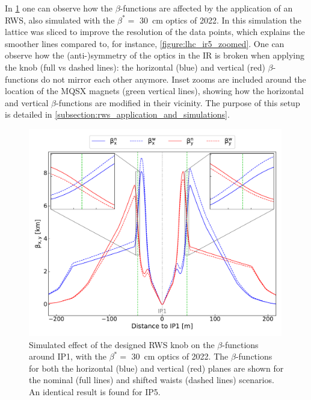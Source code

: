 In \cref{figure:rigid_waist_shift_knob_effect_on_betas} one can observe how the \(\beta\)-functions are affected by the application of an RWS, also simulated with the \(\beta^{\ast} =\) \qty{30}{\centi\metre} optics of \num{2022}.
In this simulation the lattice was sliced to improve the resolution of the data points, which explains the smoother lines compared to, for instance, \cref{figure:lhc_ir5_zoomed}.
One can observe how the (anti-)symmetry of the optics in the IR is broken when applying the knob (full vs dashed lines): the horizontal (\textcolor{mplb}{blue}) and vertical (\textcolor{mplr}{red}) \(\beta\)-functions do not mirror each other anymore.
Inset zooms are included around the location of the MQSX magnets (\textcolor{mqsx_green}{green} vertical lines), showing how the horizontal and vertical \(\beta\)-functions are modified in their vicinity.
The purpose of this setup is detailed in \cref{subsection:rws_application_and_simulations}.

\begin{figure}[!htb]
    \centering
    \includegraphics[width=0.99\textwidth]{Figures/IR_Coupling_Correction/rigid_waist_shift_betas_effect.pdf}
    \caption{Simulated effect of the designed RWS knob on the \(\beta\)-functions around IP\num{1}, with the \(\beta^{\ast} =\) \qty{30}{\centi\metre} optics of \num{2022}. The \(\beta\)-functions for both the horizontal (\textcolor{mplb}{blue}) and vertical (\textcolor{mplr}{red}) planes are shown for the nominal (full lines) and shifted waists (dashed lines) scenarios. An identical result is found for IP\num{5}.}
    \label{figure:rigid_waist_shift_knob_effect_on_betas}
\end{figure}

